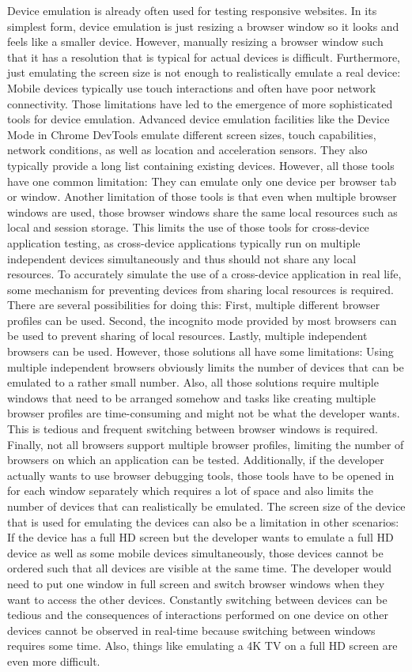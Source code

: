 Device emulation is already often used for testing responsive websites. In its simplest form, device emulation is just resizing a browser window so it looks and feels like a smaller device. However, manually resizing a browser window such that it has a resolution that is typical for actual devices is difficult. Furthermore, just emulating the screen size is not enough to realistically emulate a real device: Mobile devices typically use touch interactions and often have poor network connectivity. Those limitations have led to the emergence of more sophisticated tools for device emulation. Advanced device emulation facilities like the Device Mode in Chrome DevTools emulate different screen sizes, touch capabilities, network conditions, as well as location and acceleration sensors. They also typically provide a long list containing existing devices. However, all those tools have one common limitation: They can emulate only one device per browser tab or window. Another limitation of those tools is that even when multiple browser windows are used, those browser windows share the same local resources such as local and session storage. This limits the use of those tools for cross-device application testing, as cross-device applications typically run on multiple independent devices simultaneously and thus should not share any local resources. To accurately simulate the use of a cross-device application in real life, some mechanism for preventing devices from sharing local resources is required. There are several possibilities for doing this: First, multiple different browser profiles can be used. Second, the incognito mode provided by most browsers can be used to prevent sharing of local resources. Lastly, multiple independent browsers can be used. However, those solutions all have some limitations: Using multiple independent browsers obviously limits the number of devices that can be emulated to a rather small number. Also, all those solutions require multiple windows that need to be arranged somehow and tasks like creating multiple browser profiles are time-consuming and might not be what the developer wants. This is tedious and frequent switching between browser windows is required. Finally, not all browsers support multiple browser profiles, limiting the number of browsers on which an application can be tested. Additionally, if the developer actually wants to use browser debugging tools, those tools have to be opened in for each window separately which requires a lot of space and also limits the number of devices that can realistically be emulated. The screen size of the device that is used for emulating the devices can also be a limitation in other scenarios: If the device has a full HD screen but the developer wants to emulate a full HD device as well as some mobile devices simultaneously, those devices cannot be ordered such that all devices are visible at the same time. The developer would need to put one window in full screen and switch browser windows when they want to access the other devices. Constantly switching between devices can be tedious and the consequences of interactions performed on one device on other devices cannot be observed in real-time because switching between windows requires some time. Also, things like emulating a 4K TV on a full HD screen are even more difficult.

